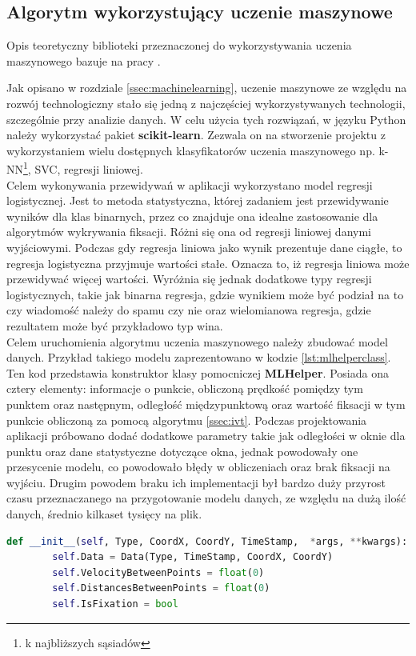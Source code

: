 \subsection{Algorytm wykorzystujący uczenie maszynowe}
\label{ssec:machinelearningalg}
Opis teoretyczny biblioteki przeznaczonej do wykorzystywania uczenia maszynowego bazuje na pracy \cite{MLPython}.\par 
Jak opisano w rozdziale \ref{ssec:machinelearning}, uczenie maszynowe ze względu na rozwój technologiczny stało się jedną z najczęściej wykorzystywanych technologii, szczególnie przy analizie danych. W celu użycia tych rozwiązań, w języku Python należy wykorzystać pakiet \textbf{scikit-learn}. Zezwala on na stworzenie projektu z wykorzystaniem wielu dostępnych klasyfikatorów uczenia maszynowego np. k-NN\footnote{k najbliższych sąsiadów}, SVC, regresji liniowej.\\
Celem wykonywania przewidywań w aplikacji wykorzystano model regresji logistycznej. Jest to metoda statystyczna, której zadaniem jest przewidywanie wyników dla klas binarnych, przez co znajduje ona idealne zastosowanie dla algorytmów wykrywania fiksacji. Różni się ona od regresji liniowej danymi wyjściowymi. Podczas gdy regresja liniowa jako wynik prezentuje dane ciągłe, to regresja logistyczna przyjmuje wartości stałe. Oznacza to, iż regresja liniowa może przewidywać więcej wartości. Wyróżnia się jednak dodatkowe typy regresji logistycznych, takie jak binarna regresja, gdzie wynikiem może być podział na to czy wiadomość należy do spamu czy nie oraz wielomianowa regresja, gdzie rezultatem może być przykładowo typ wina.\\
Celem uruchomienia algorytmu uczenia maszynowego należy zbudować model danych. Przykład takiego modelu zaprezentowano w kodzie \ref{lst:mlhelperclass}. Ten kod przedstawia konstruktor klasy pomocniczej \textbf{MLHelper}. Posiada ona cztery elementy: informacje o punkcie, obliczoną prędkość pomiędzy tym punktem oraz następnym, odległość międzypunktową oraz wartość fiksacji w tym punkcie obliczoną za pomocą algorytmu \ref{ssec:ivt}. Podczas projektowania aplikacji próbowano dodać dodatkowe parametry takie jak odległości w oknie dla punktu oraz dane statystyczne dotyczące okna, jednak powodowały one przesycenie modelu, co powodowało błędy w obliczeniach oraz brak fiksacji na wyjściu. Drugim powodem braku ich implementacji był bardzo duży przyrost czasu przeznaczanego na przygotowanie modelu danych, ze względu na dużą ilość danych, średnio kilkaset tysięcy na plik.
\begin{lstlisting}[language=Python, caption=Konstruktor klasy pomocniczej, label={lst:mlhelperclass}]
def __init__(self, Type, CoordX, CoordY, TimeStamp,  *args, **kwargs):
        self.Data = Data(Type, TimeStamp, CoordX, CoordY)
        self.VelocityBetweenPoints = float(0)
        self.DistancesBetweenPoints = float(0)
        self.IsFixation = bool
\end{lstlisting}
